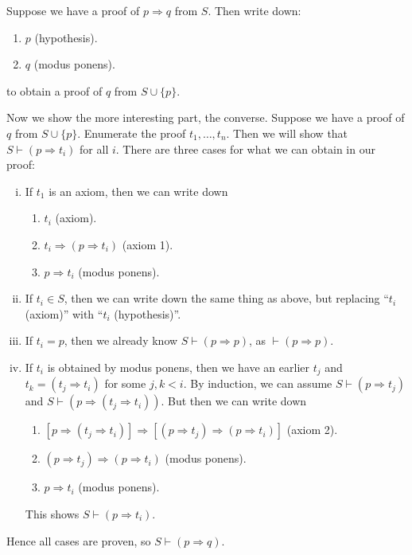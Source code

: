 \documentclass[12pt]{article}
\begin{document}
\begin{proofbox}
	Suppose we have a proof of $p \Rightarrow q$ from $S$. Then write down:
	\begin{enumerate}
		\item $p$ (hypothesis).
		\item $q$ (modus ponens).
	\end{enumerate}
	to obtain a proof of $q$ from $S \cup \{p\}$.

	Now we show the more interesting part, the converse. Suppose we have a proof of $q$ from $S \cup \{p\}$. Enumerate the proof $t_1, \ldots, t_n$. Then we will show that $S \vdash (p \Rightarrow t_i)$ for all $i$. There are three cases for what we can obtain in our proof:
	\begin{enumerate}[(i)]
		\item If $t_1$ is an axiom, then we can write down
			\begin{enumerate}[1.]
				\item $t_i$ (axiom).
				\item $t_i \Rightarrow (p \Rightarrow t_i)$ (axiom 1).
				\item $p \Rightarrow t_i$ (modus ponens).
			\end{enumerate}
		\item If $t_i \in S$, then we can write down the same thing as above, but replacing ``$t_i$ (axiom)'' with ``$t_i$ (hypothesis)''.
		\item If $t_i = p$, then we already know $S \vdash (p \Rightarrow p)$, as $\vdash (p \Rightarrow p)$.
		\item If $t_i$ is obtained by modus ponens, then we have an earlier $t_j$ and $t_k = (t_j \Rightarrow t_i)$ for some $j, k < i$. By induction, we can assume $S \vdash (p \Rightarrow t_j)$ and $S \vdash (p \Rightarrow (t_j \Rightarrow t_i))$. But then we can write down
			\begin{enumerate}[1.]
				\item $[p \Rightarrow (t_j \Rightarrow t_i)] \Rightarrow [(p \Rightarrow t_j) \Rightarrow (p \Rightarrow t_i)]$ (axiom 2).
				\item $(p \Rightarrow t_j) \Rightarrow (p \Rightarrow t_i)$ (modus ponens).
				\item $p \Rightarrow t_i$ (modus ponens).
			\end{enumerate}
			This shows $S \vdash (p \Rightarrow t_i)$.
	\end{enumerate}
	Hence all cases are proven, so $S \vdash (p \Rightarrow q)$.
\end{proofbox}
\end{document}
